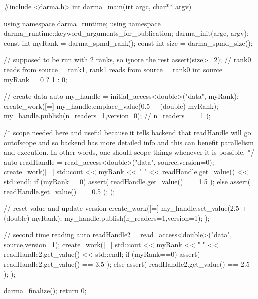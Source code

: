 \begin{CppCodeNumb}
#include <darma.h>
int darma_main(int argc, char** argv)
{
  using namespace darma_runtime; 
  using namespace darma_runtime::keyword_arguments_for_publication;
  darma_init(argc, argv);
  const int myRank = darma_spmd_rank();
  const int size = darma_spmd_size();

  // supposed to be run with 2 ranks, so ignore the rest
  assert(size>=2);
  // rank0 reads from source = rank1, rank1 reads from source = rank0 
  int source = myRank==0 ? 1 : 0;

  // create data
  auto my_handle = initial_access<double>("data", myRank);
  create_work([=]
  {
    my_handle.emplace_value(0.5 + (double) myRank);
    my_handle.publish(n_readers=1,version=0); // n_readers == 1
  });

  /* scope {} needed here and useful because it tells backend that 
     readHandle will go outofscope and so backend has more detailed 
     info and this can benefit parallelism and execution. 
     In other words, one should scope things whenever it is possible. */ 
  {
    auto readHandle = read_access<double>("data", source,version=0);
    create_work([=]
    {
      std::cout << myRank << " " << readHandle.get_value() << std::endl;
      if (myRank==0)
        assert( readHandle.get_value() == 1.5 );
      else
        assert( readHandle.get_value() == 0.5 );
    });
  }

  // reset value and update version
  create_work([=]
  {
    my_handle.set_value(2.5 + (double) myRank);
    my_handle.publish(n_readers=1,version=1);
  });

  // second time reading
  auto readHandle2 = read_access<double>("data", source,version=1);
  create_work([=]
  {
    std::cout << myRank << " " << readHandle2.get_value() << std::endl;
    if (myRank==0)
      assert( readHandle2.get_value() == 3.5 );
    else
      assert( readHandle2.get_value() == 2.5 );
  });

  darma_finalize();
  return 0;
}
\end{CppCodeNumb}









